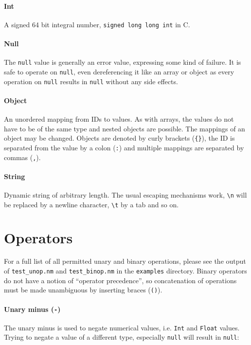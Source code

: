 \documentclass[a4paper, parskip, 10pt]{scrartcl}
\begin{document}
\paragraph{Int} A signed 64 bit integral number, \texttt{signed long long int}
in C.

\paragraph{Null} The \texttt{null} value is generally an error value,
expressing some kind of failure. It is safe to operate on \texttt{null}, even
dereferencing it like an array or object as every operation on \texttt{null}
results in \texttt{null} without any side effects.

\paragraph{Object} An unordered mapping from IDs to values. As with arrays, the
values do not have to be of the same type and nested objects are possible. The
mappings of an object may be changed. Objects are denoted by curly brackets
(\texttt{\{\}}), the ID is separated from the value by a colon (\texttt{:}) and
multiple mappings are separated by commas (\texttt{,}).

\paragraph{String} Dynamic string of arbitrary length. The usual escaping
mechanisms work, \texttt{\textbackslash{}n} will be replaced by a newline
character, \texttt{\textbackslash{}t} by a tab and so on.

\section{Operators}
For a full list of all permitted unary and binary operations, please see the
output of \texttt{test\_unop.nm} and \texttt{test\_binop.nm} in the
\texttt{examples} directory. Binary operators do not have a notion of
\enquote{operator precedence}, so concatenation of operations must be made
unambiguous by inserting braces (\texttt{()}).

\paragraph{Unary minus (\texttt{-})}
The unary minus is used to negate numerical values, i.e. \texttt{Int} and
\texttt{Float} values. Trying to negate a value of a different type, especially
\texttt{null} will result in \texttt{null}:
\end{document}
